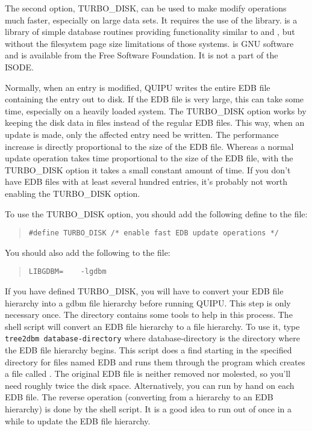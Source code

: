 The second option, TURBO\_DISK, can be used to make modify operations
much faster, especially on large data sets.  It requires the use
of the  library.   is a
library of simple database routines
providing functionality similar to 
and , but without the
filesystem page size limitations of those systems.  
 is GNU
software and is available from the Free Software Foundation.  It is
not a part of the ISODE.

Normally, when an
entry is modified, QUIPU writes the entire EDB file containing the entry
out to disk.  If the EDB file is very large, this can
take some time, especially on a heavily loaded system.  The TURBO\_DISK
option works by keeping the disk data in  files instead of the
regular EDB files.  This way, when an update is made, only the 
affected entry need be written.  The performance increase 
is directly proportional to the size of the EDB file.
Whereas a normal update operation takes time proportional to the size
of the EDB file, with the TURBO\_DISK option it takes a small constant
amount of time.  If you don't have EDB files with
at least several hundred entries, it's probably not worth enabling
the TURBO\_DISK option.

To use the TURBO\_DISK option, you should add the following define to the 
 file:
\begin{quote}\begin{verbatim}
#define TURBO_DISK /* enable fast EDB update operations */
\end{verbatim}\end{quote}
You should also add the following to the 
 file:
\begin{quote}\begin{verbatim}
LIBGDBM=	-lgdbm
\end{verbatim}\end{quote}

If you have defined TURBO\_DISK, you will have to
convert your EDB file hierarchy into a gdbm file hierarchy
before running QUIPU.  This step
is only necessary once.  The  directory contains some
tools to help in this process.  The shell script  will
convert an EDB file hierarchy to a  file hierarchy.  To use it,
type \verb+tree2dbm database-directory+ where database-directory is the
directory where the EDB file hierarchy begins.  This script does a
find starting in the specified directory
for files named EDB and runs them through the
 program which creates a file called .
The original EDB file is neither removed nor
molested, so you'll need roughly twice the disk space.  Alternatively, you
can run  by hand on each EDB file.  The reverse operation
(converting from a  hierarchy to an EDB hierarchy) is done
by the  shell script.  It is a good idea to run 
 out of  once in a while to update the
EDB file hierarchy.

